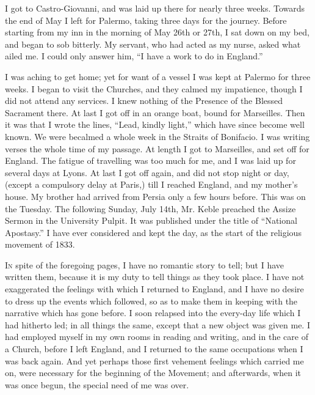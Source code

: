 I got to Castro-Giovanni, and was laid up there for nearly three
weeks. Towards the end of May I left for Palermo, taking three days for the journey. Before
starting from my inn in the morning of May 26th or 27th, I sat down on
my bed, and began to sob bitterly. My servant, who had acted as my
nurse, asked what ailed me. I could only answer him, ``I
have a work to do in England.''

I was aching to get home; yet for want of a vessel I was kept at
Palermo for three weeks. I began to visit the Churches, and they
calmed my impatience, though I did not attend any services. I knew
nothing of the Presence of the Blessed Sacrament there. At last I got
off in an orange boat, bound for Marseilles. Then it was that I wrote the lines,
``Lead, kindly light,'' which have since become well known. We were
becalmed a whole week in the Straits of Bonifacio. I was
writing verses the whole time of my passage. At length I got to
Marseilles, and set off for England. The fatigue of travelling was too
much for me, and I was laid up for several days at Lyons. At last I
got off again, and did not stop night or day, (except a
compulsory delay at Paris,) till I reached England, and my
mother's house. My brother had arrived from Persia only a few hours
before. This was on the Tuesday. The following Sunday, July 14th, Mr.
Keble preached the Assize Sermon in the University Pulpit. It was
published under the title of ``National Apostasy.'' I have ever
considered and kept the day, as the start of the religious movement of
1833.


I\textsc{n} spite of the foregoing pages,
I have no romantic story to tell; but I have written them, because it is my duty to tell things as they took place. I have
not exaggerated the feelings with which I returned to England, and I
have no desire to dress up the events which followed, so as to make them
in keeping with the narrative which has gone before. I soon relapsed
into the every-day life which I had hitherto led; in all things the same,
except that a new object was given me. I had employed myself in my own
rooms in reading and writing, and in the care of a Church, before I left
England, and I returned to the same occupations when I was back again.
And yet perhaps those first vehement feelings which carried me on, were
necessary for the beginning of the Movement; and afterwards, when it was
once begun, the special need of me was over.

